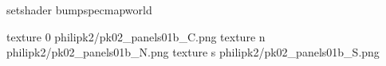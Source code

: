 setshader bumpspecmapworld

texture 0 philipk2/pk02_panels01b_C.png
texture n philipk2/pk02_panels01b_N.png
texture s philipk2/pk02_panels01b_S.png

